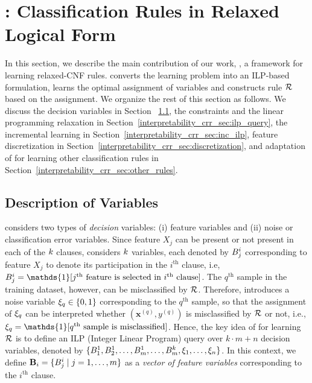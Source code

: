 \section{{\crr}: Classification Rules in Relaxed Logical Form}
\label{interpretability_crr_sec:ilp}
In this section, we describe the main contribution of our work, {\crr}, a  framework for learning   relaxed-CNF rules.  {\crr}  converts the learning problem into  an ILP-based formulation,  learns the optimal assignment of variables and constructs rule $ {\mathcal{R}} $ based on the assignment. We organize the rest of this section as follows.
We  discuss the decision variables in Section ~\ref{interpretability_crr_sec:variables},  the constraints and the linear programming relaxation in Section~\ref{interpretability_crr_sec:ilp_query}, the incremental learning in Section~\ref{interpretability_crr_sec:inc_ilp}, feature discretization in Section~\ref{interpretability_crr_sec:discretization}, and adaptation of {\crr} for learning other classification rules in Section~\ref{interpretability_crr_sec:other_rules}.




\subsection{Description of Variables}
\label{interpretability_crr_sec:variables}
{\crr} considers two types of  \emph{decision} variables: (i) feature variables and (ii) noise or classification error variables.
Since  feature $ X_j $ can be present or not present  in each of  the  $ k $ clauses, {\crr} considers $ k $   variables, each denoted by $ B^i_j  $  corresponding to   feature $ X_j $  to denote its participation  in the $ i^\text{th} $ clause, i.e, $ \bool^i_j=\mathds{1}[j^\text{th}\text{ feature is selected in }i^\text{th}\text{ clause}]  $.  The $ q^\text{th} $ sample in the training dataset, however, can be misclassified by $ {\mathcal{R}} $.  Therefore, {\crr}  introduces  a noise variable $ \xi_q \in \{0,1\}  $  corresponding to the $ q^\text{th} $ sample, so that the assignment of $ \xi_q  $ can be interpreted whether $ (\mathbf{x}^{(q)}, y^{(q)}) $ is misclassified by $ {\mathcal{R}} $ or not, i.e., $ \noise_q=\mathds{1}[q^\text{th}\text{ sample is misclassified}] $.  Hence, the key idea of {{\crr}} for learning $ {\mathcal{R}} $ is to define an ILP (Integer Linear Program) query over $k \cdot m + n$  decision variables, denoted by $\{ B_{1}^{1}, B_{2}^{1}, \dots ,B_{m}^{1}, \dots ,B_{m}^{k}, \xi_1, \dots ,\xi_n\}$.   In this context, we define $\mathbf{B}_i = \{B^i_{j} \mid j= 1,\dots,m\}$ as a \emph{vector of   feature variables} corresponding to the $ i^\text{th} $ clause.


